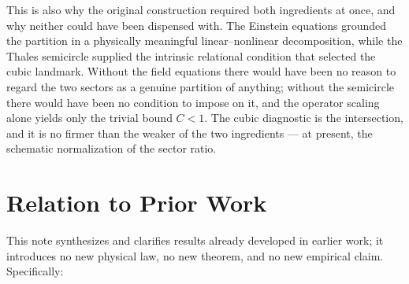 \documentclass[11pt,a4paper]{article}
\theoremstyle{definition}
\theoremstyle{plain}
\theoremstyle{remark}
\begin{document}
This is also why the original construction required both ingredients at once,
and why neither could have been dispensed with. The Einstein equations grounded
the partition in a physically meaningful linear--nonlinear decomposition, while
the Thales semicircle supplied the intrinsic relational condition that selected
the cubic landmark. Without the field equations there would have been no reason
to regard the two sectors as a genuine partition of anything; without the
semicircle there would have been no condition to impose on it, and the operator
scaling alone yields only the trivial bound $C<1$. The cubic diagnostic is the
intersection, and it is no firmer than the weaker of the two ingredients --- at
present, the schematic normalization of the sector ratio.

\section{Relation to Prior Work}
\label{sec:priorwork}

This note synthesizes and clarifies results already developed in earlier work;
it introduces no new physical law, no new theorem, and no new empirical claim.
Specifically:
\end{document}
